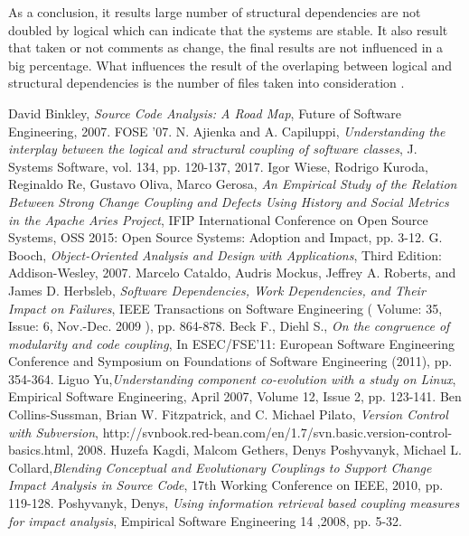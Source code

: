 \documentclass[12pt,a4paper,oneside]{report}
\begin{document}
As a conclusion, it results large number of structural dependencies are not doubled by logical which can indicate that the systems are stable. It also result that taken or not comments as change, the final results are not influenced in a big percentage. What influences the result of the overlaping between logical and structural dependencies is the number of files taken into consideration .


\begin{thebibliography}{1}

David Binkley, \emph{Source Code Analysis: A Road Map}, Future of Software Engineering, 2007. FOSE '07.
N. Ajienka and A. Capiluppi, \emph{Understanding the interplay between the logical and structural coupling of software classes}, J. Systems Software, vol. 134, pp. 120-137, 2017.
Igor Wiese, Rodrigo Kuroda, Reginaldo Re, Gustavo Oliva, Marco Gerosa, \emph{An Empirical Study of the Relation Between Strong Change Coupling and Defects Using History and Social Metrics in the Apache Aries Project}, IFIP International Conference on Open Source Systems, OSS 2015: Open Source Systems: Adoption and Impact, pp. 3-12.
G. Booch, \emph{Object-Oriented Analysis and Design with Applications}, Third Edition: Addison-Wesley, 2007.
Marcelo Cataldo, Audris Mockus, Jeffrey A. Roberts, and James D. Herbsleb, \emph{Software Dependencies, Work Dependencies, and Their Impact on Failures},  IEEE Transactions on Software Engineering ( Volume: 35, Issue: 6, Nov.-Dec. 2009 ), pp. 864-878.
Beck F., Diehl S.,\emph{ On the congruence of modularity and code coupling}, In ESEC/FSE'11: European Software Engineering Conference and Symposium on Foundations of Software Engineering (2011), pp. 354-364.
Liguo Yu,\emph{Understanding component co-evolution with a study on Linux}, Empirical Software Engineering, April 2007, Volume 12, Issue 2, pp. 123-141.
 Ben Collins-Sussman, Brian W. Fitzpatrick, and C. Michael Pilato, \emph{Version Control with Subversion}, http://svnbook.red-bean.com/en/1.7/svn.basic.version-control-basics.html, 2008.
 Huzefa Kagdi, Malcom Gethers, Denys Poshyvanyk, Michael L. Collard,\emph{Blending Conceptual and Evolutionary Couplings to Support Change Impact Analysis in Source Code}, 17th Working Conference on IEEE, 2010, pp. 119-128.
Poshyvanyk, Denys, \emph{Using information retrieval based coupling measures for impact analysis}, Empirical Software Engineering 14 ,2008, pp. 5-32.

\end{thebibliography}
\end{document}
